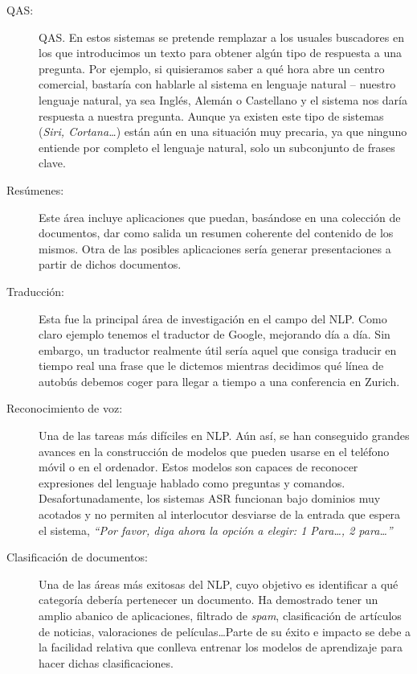 \begin{description}\label{sec:nlpfields}
  \item[QAS:] \ac{QAS}. En estos sistemas se pretende
    remplazar a los usuales buscadores en los que introducimos un texto para
    obtener algún tipo de respuesta a una pregunta. Por ejemplo, si quisieramos
    saber a qué hora abre un centro comercial, bastaría con hablarle al sistema
    en lenguaje natural -- nuestro lenguaje natural, ya sea Inglés, Alemán o
    Castellano y el sistema nos daría respuesta a nuestra pregunta. Aunque ya
    existen este tipo de sistemas (\eg \emph{Siri, Cortana\dots}) están aún en
    una situación muy precaria, ya que ninguno entiende por completo el lenguaje
    natural, solo un subconjunto de frases clave.
  \item[Resúmenes:] Este área incluye aplicaciones que puedan, basándose en una
    colección de documentos, dar como salida un resumen coherente del contenido
    de los mismos. Otra de las posibles aplicaciones sería generar
    presentaciones a partir de dichos documentos.
  \item[Traducción:] Esta fue la principal área de investigación en el campo del
    \ac{NLP}. Como claro ejemplo tenemos el traductor de Google, mejorando día a
    día. Sin embargo, un traductor realmente útil sería aquel que consiga
    traducir en tiempo real una frase que le dictemos mientras decidimos qué
    línea de autobús debemos coger para llegar a tiempo a una conferencia en
    Zurich.
  \item[Reconocimiento de voz:] Una de las tareas más difíciles en \ac{NLP}. Aún
    así, se han conseguido grandes avances en la construcción de modelos que
    pueden usarse en el teléfono móvil o en el ordenador. Estos modelos son
    capaces de reconocer expresiones del lenguaje hablado como preguntas y
    comandos. Desafortunadamente, los sistemas \ac{ASR}
    funcionan bajo dominios muy acotados y no permiten al interlocutor desviarse
    de la entrada que espera el sistema, \eg \emph{``Por favor, diga ahora la
      opción a elegir: 1 Para\dots, 2 para\dots''}
  \item[Clasificación de documentos:] Una de las áreas más exitosas del
    \ac{NLP}, cuyo objetivo es identificar a qué categoría debería pertenecer un
    documento. Ha demostrado tener un amplio abanico de aplicaciones, \eg
    filtrado de \emph{spam}, clasificación de artículos de noticias,
    valoraciones de películas\dots Parte de su éxito e impacto se debe a la
    facilidad relativa que conlleva entrenar los modelos de aprendizaje para
    hacer dichas clasificaciones.
\end{description}

